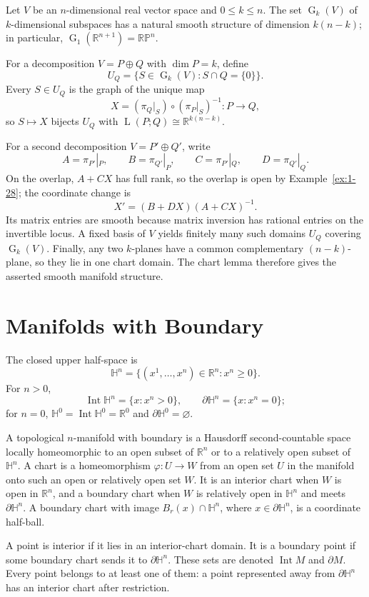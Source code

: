 \begin{example}
\label{ex:1-36}
\leanok
{}
Let $V$ be an $n$-dimensional real vector space and $0\leq k\leq n$. The set
$\operatorname G_k(V)$ of $k$-dimensional subspaces has a natural smooth
structure of dimension $k(n-k)$; in particular,
$\operatorname G_1(\mathbb R^{n+1})=\mathbb{RP}^n$.

For a decomposition $V=P\oplus Q$ with $\dim P=k$, define
\[
U_Q=\{S\in\operatorname G_k(V):S\cap Q=\{0\}\}.
\]
Every $S\in U_Q$ is the graph of the unique map
\[
X=(\pi_Q|_S)\circ(\pi_P|_S)^{-1}:P\to Q,
\]
so $S\mapsto X$ bijects $U_Q$ with
$\operatorname L(P;Q)\cong\mathbb R^{k(n-k)}$.

For a second decomposition $V=P'\oplus Q'$, write
\[
A=\pi_{P'}|_P,\qquad B=\pi_{Q'}|_P,\qquad
C=\pi_{P'}|_Q,\qquad D=\pi_{Q'}|_Q.
\]
On the overlap, $A+CX$ has full rank, so the overlap is open by
Example~\ref{ex:1-28}; the coordinate change is
\[
X'=(B+DX)(A+CX)^{-1}.
\]
Its matrix entries are smooth because matrix inversion has rational entries on
the invertible locus. A fixed basis of $V$ yields finitely many such domains
$U_Q$ covering $\operatorname G_k(V)$. Finally, any two $k$-planes have a
common complementary $(n-k)$-plane, so they lie in one chart domain. The chart
lemma therefore gives the asserted smooth manifold structure.
\end{example}


\section{Manifolds with Boundary}

\begin{definition}
\label{def:1-5-extra-1}
\leanok
The closed upper half-space is
\[
\mathbb H^n=\{(x^1,\ldots,x^n)\in\mathbb R^n:x^n\geq0\}.
\]
For $n>0$,
\[
\operatorname{Int}\mathbb H^n=\{x:x^n>0\},\qquad
\partial\mathbb H^n=\{x:x^n=0\};
\]
for $n=0$, $\mathbb H^0=\operatorname{Int}\mathbb H^0=\mathbb R^0$ and
$\partial\mathbb H^0=\varnothing$.

A topological $n$-manifold with boundary is a Hausdorff second-countable space
locally homeomorphic to an open subset of $\mathbb R^n$ or to a relatively
open subset of $\mathbb H^n$. A chart is a homeomorphism
$\varphi:U\to W$ from an open set $U$ in the manifold onto such an open or
relatively open set $W$. It is an interior chart when $W$ is open in
$\mathbb R^n$, and a boundary chart when $W$ is relatively open in
$\mathbb H^n$ and meets $\partial\mathbb H^n$. A boundary chart with image
$B_r(x)\cap\mathbb H^n$, where $x\in\partial\mathbb H^n$, is a coordinate
half-ball.

A point is interior if it lies in an interior-chart domain. It is a boundary
point if some boundary chart sends it to $\partial\mathbb H^n$. These sets are
denoted $\operatorname{Int}M$ and $\partial M$. Every point belongs to at least
one of them: a point represented away from $\partial\mathbb H^n$ has an
interior chart after restriction.
\end{definition}

